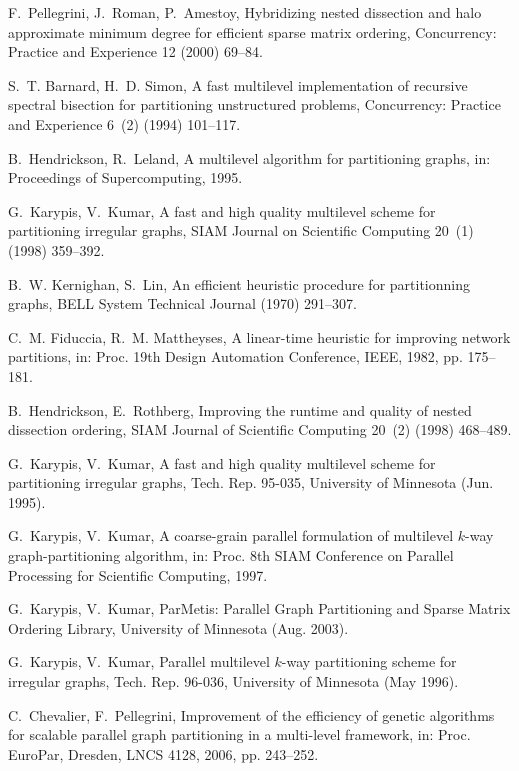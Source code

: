 \documentclass[fleqn,12pt,twoside]{article}
\begin{document}
\begin{thebibliography}{10}
F.~Pellegrini, J.~Roman, P.~Amestoy, Hybridizing nested dissection and halo
  approximate minimum degree for efficient sparse matrix ordering,
  {C}oncurrency: {P}ractice and {E}xperience 12 (2000) 69--84.

S.~T. Barnard, H.~D. Simon, A fast multilevel implementation of recursive
  spectral bisection for partitioning unstructured problems, {C}oncurrency:
  {P}ractice and {E}xperience 6~(2) (1994) 101--117.

B.~Hendrickson, R.~Leland, A multilevel algorithm for partitioning graphs, in:
  Proceedings of Supercomputing, 1995.

G.~Karypis, V.~Kumar, A fast and high quality multilevel scheme for
  partitioning irregular graphs, {SIAM} {J}ournal on {S}cientific {C}omputing
  20~(1) (1998) 359--392.

B.~W. Kernighan, S.~Lin, An efficient heuristic procedure for partitionning
  graphs, {BELL} System Technical Journal (1970) 291--307.

C.~M. Fiduccia, R.~M. Mattheyses, A linear-time heuristic for improving network
  partitions, in: Proc\@. 19th {D}esign {A}utomation {C}onference, {IEEE},
  1982, pp. 175--181.

B.~Hendrickson, E.~Rothberg, Improving the runtime and quality of nested
  dissection ordering, {SIAM} {J}ournal of {S}cientific {C}omputing 20~(2)
  (1998) 468--489.

G.~Karypis, V.~Kumar, A fast and high quality multilevel scheme for
  partitioning irregular graphs, Tech. Rep. 95-035, {U}niversity of {M}innesota
  (Jun. 1995).

G.~Karypis, V.~Kumar, A coarse-grain parallel formulation of multilevel
  {$k$}-way graph-partitioning algorithm, in: Proc. 8th {SIAM} Conference on
  Parallel Processing for Scientific Computing, 1997.

G.~Karypis, V.~Kumar, {\sc ParMetis}: Parallel Graph Partitioning and Sparse
  Matrix Ordering Library, University of Minnesota (Aug. 2003).

G.~Karypis, V.~Kumar, Parallel multilevel $k$-way partitioning scheme for
  irregular graphs, Tech. Rep. 96-036, University of Minnesota (May 1996).

C.~Chevalier, F.~Pellegrini, Improvement of the efficiency of genetic
  algorithms for scalable parallel graph partitioning in a multi-level
  framework, in: Proc\@. EuroPar, Dresden, LNCS 4128, 2006, pp. 243--252.


\end{thebibliography}
\end{document}
